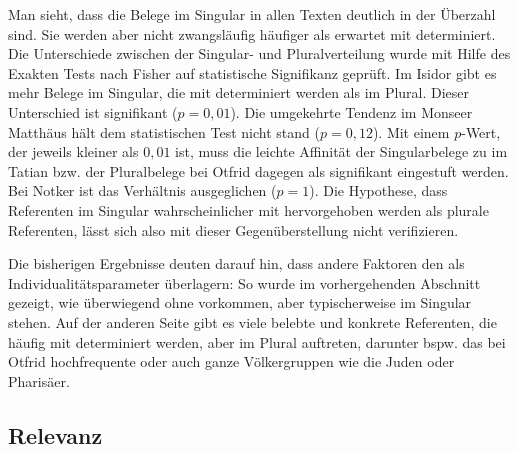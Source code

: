 Man sieht, dass die Belege im Singular in allen Texten deutlich in der Überzahl sind. Sie werden aber nicht zwangsläufig häufiger als erwartet mit  determiniert. Die Unterschiede zwischen der Singular- und Pluralverteilung wurde mit Hilfe des Exakten Tests nach Fisher auf statistische Signifikanz geprüft. Im Isidor gibt es mehr Belege im Singular, die mit  determiniert werden als im Plural. Dieser Unterschied ist signifikant ($p=0{,}01$). Die umgekehrte Tendenz im Monseer Matthäus hält dem statistischen Test nicht stand ($p=0{,}12$). Mit einem $p$-Wert,
der jeweils kleiner als $0{,}01$ ist, muss die leichte Affinität der Singularbelege zu  im Tatian bzw. der Pluralbelege bei Otfrid dagegen als signifikant eingestuft werden. Bei Notker ist das Verhältnis ausgeglichen ($p=1$). Die Hypothese, dass Referenten im
Singular wahrscheinlicher mit  hervorgehoben werden als plurale
Referenten, lässt sich also mit dieser Gegenüberstellung nicht verifizieren. 

Die bisherigen Ergebnisse deuten darauf hin, dass andere Faktoren den  als Individualitätsparameter  überlagern: So wurde im vorhergehenden Abschnitt gezeigt, wie  überwiegend ohne  vorkommen, aber typischerweise im Singular stehen. Auf der anderen Seite gibt es viele belebte und konkrete Referenten, die häufig mit  determiniert werden, aber im Plural auftreten, darunter bspw. das bei Otfrid hochfrequente   oder auch ganze Völkergruppen wie die Juden oder Pharisäer.


\subsection{Relevanz}\label{sec:ergeb-relevanz}

